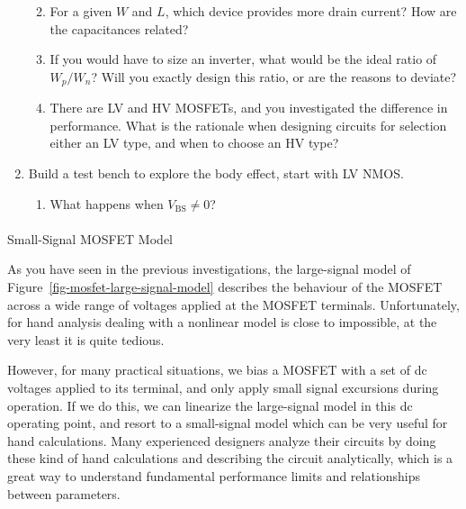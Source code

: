 \documentclass[
  a4paper,
  DIV=11,
  numbers=noendperiod]{scrartcl}
\makeatletter
\let\oldparagraph\paragraph
\renewcommand{\paragraph}{
    \@ifstar
      \xxxParagraphStar
      \xxxParagraphNoStar
  }
\newcommand{\xxxParagraphStar}[1]{\oldparagraph*{#1}\mbox{}}
\newcommand{\xxxParagraphNoStar}[1]{\oldparagraph{#1}\mbox{}}
\providecommand{\tightlist}{%
  \setlength{\itemsep}{0pt}\setlength{\parskip}{0pt}}\usepackage{longtable,booktabs,array}
\makeatother
\begin{document}
\begin{tcolorbox}
\begin{enumerate}
  \begin{enumerate}
  \def\labelenumii{\arabic{enumii}.}
  \tightlist
  \item
    For a given \(W\) and \(L\), which device provides more drain
    current? How are the capacitances related?
  \item
    If you would have to size an inverter, what would be the ideal ratio
    of \(W_p/W_n\)? Will you exactly design this ratio, or are the
    reasons to deviate?
  \item
    There are LV and HV MOSFETs, and you investigated the difference in
    performance. What is the rationale when designing circuits for
    selection either an LV type, and when to choose an HV type?
  \end{enumerate}
\item
  Build a test bench to explore the body effect, start with LV NMOS.

  \begin{enumerate}
  \def\labelenumii{\arabic{enumii}.}
  \tightlist
  \item
    What happens when \(V_\mathrm{BS} \neq 0\)?
  \end{enumerate}
\end{enumerate}

\end{tcolorbox}

\paragraph{Small-Signal MOSFET
Model}\label{sec-mosfet-smallsignal-model}

As you have seen in the previous investigations, the large-signal model
of Figure~\ref{fig-mosfet-large-signal-model} describes the behaviour of
the MOSFET across a wide range of voltages applied at the MOSFET
terminals. Unfortunately, for hand analysis dealing with a nonlinear
model is close to impossible, at the very least it is quite tedious.

However, for many practical situations, we bias a MOSFET with a set of
dc voltages applied to its terminal, and only apply small signal
excursions during operation. If we do this, we can linearize the
large-signal model in this dc operating point, and resort to a
small-signal model which can be very useful for hand calculations. Many
experienced designers analyze their circuits by doing these kind of hand
calculations and describing the circuit analytically, which is a great
way to understand fundamental performance limits and relationships
between parameters.
\end{document}
